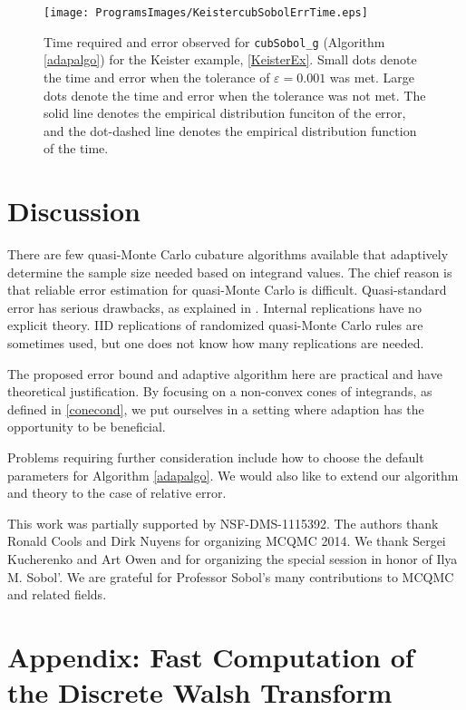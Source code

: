 \documentclass[graybox,footinfo]{svmult}
\begin{document}
\begin{figure}
\centering
\texttt{[image: ProgramsImages/KeistercubSobolErrTime.eps]}
\caption{Time required and error observed for \texttt{cubSobol\_g} (Algorithm \ref{adapalgo}) for the Keister example,  \eqref{KeisterEx}. Small dots denote the time and error when the tolerance of $\varepsilon=0.001$ was met.  Large dots denote the time and error when the tolerance was not met.  The solid line denotes the empirical distribution funciton of the error, and the dot-dashed line denotes the empirical distribution function of the time. \label{numexamplesfig}} 
\end{figure}

\section{Discussion}

There are few quasi-Monte Carlo cubature algorithms available that adaptively determine the sample size needed based on integrand values.  The chief reason is that reliable error estimation for quasi-Monte Carlo is difficult.  Quasi-standard error has serious drawbacks, as explained in \cite{Owe06a}.  Internal replications have no explicit theory.  IID replications of randomized quasi-Monte Carlo rules are sometimes used, but one does not know how many replications are needed.

The proposed error bound and adaptive algorithm here are practical and have theoretical justification.  By focusing on a non-convex cones of integrands, as defined in  \eqref{conecond}, we put ourselves in a setting where adaption has the opportunity to be beneficial.

Problems requiring further consideration include how to choose the default parameters for Algorithm \ref{adapalgo}.  We would also like to extend our algorithm and theory to the case of relative error. 


\begin{acknowledgement}
This work was partially supported by NSF-DMS-1115392.  The authors thank Ronald Cools and Dirk Nuyens for organizing MCQMC 2014.  We thank Sergei Kucherenko and Art Owen and for organizing the special session in honor of Ilya M. Sobol'.  We are grateful for Professor Sobol's many contributions to MCQMC and related fields. 
\end{acknowledgement}




\section*{Appendix:  Fast Computation of the Discrete Walsh Transform}
\end{document}
